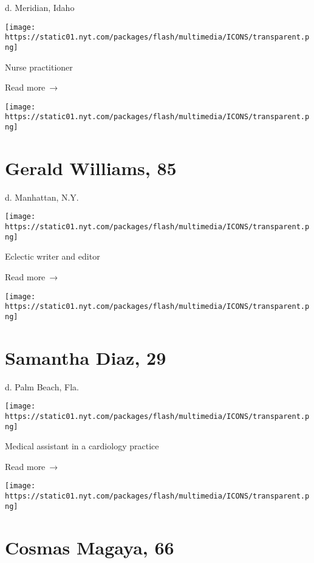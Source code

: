 d. Meridian, Idaho

\texttt{[image: https://static01.nyt.com/packages/flash/multimedia/ICONS/transparent.png]}

Nurse practitioner

 Read more~→

\href{https://www.nytimes.com/2020/07/23/obituaries/gerald-williams-dead-coronavirus.html}{}

\texttt{[image: https://static01.nyt.com/packages/flash/multimedia/ICONS/transparent.png]}

\hypertarget{gerald-williams-85}{%
\section{Gerald Williams, 85}\label{gerald-williams-85}}

d. Manhattan, N.Y.

\texttt{[image: https://static01.nyt.com/packages/flash/multimedia/ICONS/transparent.png]}

Eclectic writer and editor

 Read more~→

\href{https://www.nytimes.com/2020/07/22/obituaries/samantha-diaz-dead-coronavirus.html}{}

\texttt{[image: https://static01.nyt.com/packages/flash/multimedia/ICONS/transparent.png]}

\hypertarget{samantha-diaz-29}{%
\section{Samantha Diaz, 29}\label{samantha-diaz-29}}

d. Palm Beach, Fla.

\texttt{[image: https://static01.nyt.com/packages/flash/multimedia/ICONS/transparent.png]}

Medical assistant in a cardiology practice

 Read more~→

\href{https://www.nytimes.com/2020/07/21/obituaries/cosmas-magaya-dead-coronavirus.html}{}

\texttt{[image: https://static01.nyt.com/packages/flash/multimedia/ICONS/transparent.png]}

\hypertarget{cosmas-magaya-66}{%
\section{Cosmas Magaya, 66}\label{cosmas-magaya-66}}

